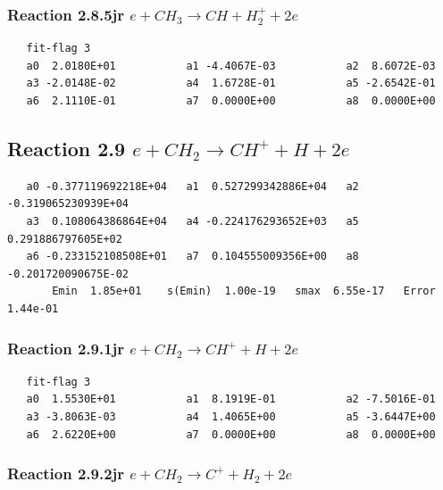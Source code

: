 \documentclass[12pt,dvipdfmx]{article}
\begin{document}
\subsubsection{
Reaction 2.8.5jr    $e + CH_{3} \rightarrow CH + H_{2}^{+} + 2e $
}

\begin{small}\begin{verbatim}
   fit-flag 3
   a0  2.0180E+01           a1 -4.4067E-03           a2  8.6072E-03
   a3 -2.0148E-02           a4  1.6728E-01           a5 -2.6542E-01
   a6  2.1110E-01           a7  0.0000E+00           a8  0.0000E+00
\end{verbatim}\end{small}


\subsection{
Reaction 2.9     $e + CH_2 \rightarrow  CH^+ + H + 2e $
}

\begin{small}\begin{verbatim}
   a0 -0.377119692218E+04   a1  0.527299342886E+04   a2 -0.319065230939E+04
   a3  0.108064386864E+04   a4 -0.224176293652E+03   a5  0.291886797605E+02
   a6 -0.233152108508E+01   a7  0.104555009356E+00   a8 -0.201720090675E-02
       Emin  1.85e+01    s(Emin)  1.00e-19   smax  6.55e-17   Error  1.44e-01
\end{verbatim}\end{small}

\subsubsection{
Reaction 2.9.1jr   $e + CH_{2} \rightarrow CH^{+} + H + 2e $
}

\begin{small}\begin{verbatim}
   fit-flag 3
   a0  1.5530E+01           a1  8.1919E-01           a2 -7.5016E-01
   a3 -3.8063E-03           a4  1.4065E+00           a5 -3.6447E+00
   a6  2.6220E+00           a7  0.0000E+00           a8  0.0000E+00
\end{verbatim}\end{small}

\subsubsection{
Reaction 2.9.2jr   $e + CH_{2} \rightarrow C^{+} + H_{2} + 2e $
}
\end{document}
